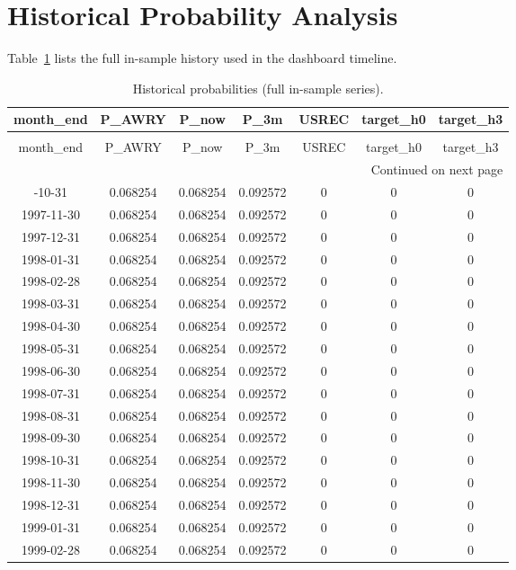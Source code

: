 \documentclass[conference,onecolumn]{IEEEtran}
\begin{document}
\section{Historical Probability Analysis}
Table~\ref{tab:hist} lists the full in-sample history used in the dashboard timeline.
\begin{longtable}{|c|c|c|c|c|c|c|}
\caption{Historical probabilities (full in-sample series).} \label{tab:hist} \\
\toprule
month\_end & P\_AWRY & P\_now & P\_3m & USREC & target\_h0 & target\_h3 \\
\midrule
\endfirsthead
\caption[]{Historical probabilities (full in-sample series).} \\
\toprule
month\_end & P\_AWRY & P\_now & P\_3m & USREC & target\_h0 & target\_h3 \\
\midrule
\endhead
\midrule
\multicolumn{7}{r}{Continued on next page} \\
\midrule
\endfoot
\bottomrule
\endlastfoot
1997-10-31 & 0.068254 & 0.068254 & 0.092572 & 0 & 0 & 0 \\
1997-11-30 & 0.068254 & 0.068254 & 0.092572 & 0 & 0 & 0 \\
1997-12-31 & 0.068254 & 0.068254 & 0.092572 & 0 & 0 & 0 \\
1998-01-31 & 0.068254 & 0.068254 & 0.092572 & 0 & 0 & 0 \\
1998-02-28 & 0.068254 & 0.068254 & 0.092572 & 0 & 0 & 0 \\
1998-03-31 & 0.068254 & 0.068254 & 0.092572 & 0 & 0 & 0 \\
1998-04-30 & 0.068254 & 0.068254 & 0.092572 & 0 & 0 & 0 \\
1998-05-31 & 0.068254 & 0.068254 & 0.092572 & 0 & 0 & 0 \\
1998-06-30 & 0.068254 & 0.068254 & 0.092572 & 0 & 0 & 0 \\
1998-07-31 & 0.068254 & 0.068254 & 0.092572 & 0 & 0 & 0 \\
1998-08-31 & 0.068254 & 0.068254 & 0.092572 & 0 & 0 & 0 \\
1998-09-30 & 0.068254 & 0.068254 & 0.092572 & 0 & 0 & 0 \\
1998-10-31 & 0.068254 & 0.068254 & 0.092572 & 0 & 0 & 0 \\
1998-11-30 & 0.068254 & 0.068254 & 0.092572 & 0 & 0 & 0 \\
1998-12-31 & 0.068254 & 0.068254 & 0.092572 & 0 & 0 & 0 \\
1999-01-31 & 0.068254 & 0.068254 & 0.092572 & 0 & 0 & 0 \\
1999-02-28 & 0.068254 & 0.068254 & 0.092572 & 0 & 0 & 0 \\

\end{longtable}
\end{document}
